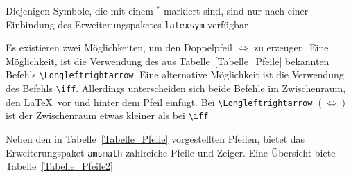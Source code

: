 \documentclass[a4paper,10pt,twoside]{scrbook}
\begin{document}
{Diejenigen Symbole, die mit einem $^\ast$ markiert sind, sind nur nach einer
Einbindung des Erweiterungspaketes \texttt{latexsym} verfügbar

Es existieren zwei Möglichkeiten, um den Doppelpfeil $\Longleftrightarrow$ zu erzeugen.
Eine Möglichkeit, ist die Verwendung des aus Tabelle~\ref{Tabelle_Pfeile} bekannten Befehls
\verb!\Longleftrightarrow!. Eine alternative Möglichkeit ist die Verwendung des Befehls
\verb!\iff!. Allerdings unterscheiden sich beide
Befehle im Zwischenraum, den \LaTeX\ vor und hinter dem Pfeil einfügt.
Bei \verb!\Longleftrightarrow! $(\Longleftrightarrow)$
ist der Zwischenraum etwas kleiner als bei \verb!\iff! 

Neben den in Tabelle~\ref{Tabelle_Pfeile} vorgestellten Pfeilen, 
bietet das Erweiterungspaket \texttt{amsmath} zahlreiche
Pfeile und Zeiger. Eine Übersicht biete Tabelle~\ref{Tabelle_Pfeile2}

}
\end{document}
